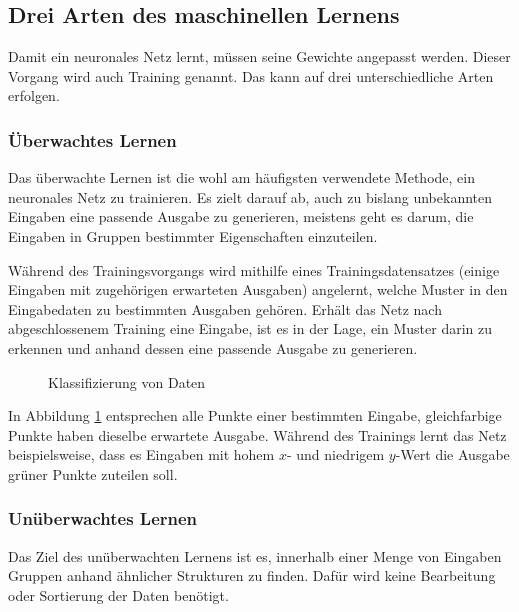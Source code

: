 \documentclass[12pt,a4]{article}
\begin{document}
\subsection{Drei Arten des maschinellen Lernens \cite{PythonMachineLearningChapter1}}
Damit ein neuronales Netz lernt, müssen seine Gewichte angepasst werden. Dieser Vorgang wird auch Training genannt. Das kann auf drei unterschiedliche Arten erfolgen.

\subsubsection{Überwachtes Lernen}
Das überwachte Lernen ist die wohl am häufigsten verwendete Methode, ein neuronales Netz zu trainieren. Es zielt darauf ab, auch zu bislang unbekannten Eingaben eine passende Ausgabe zu generieren, meistens geht es darum, die Eingaben in Gruppen bestimmter Eigenschaften einzuteilen. 

Während des Trainingsvorgangs wird mithilfe eines Trainingsdatensatzes (einige Eingaben mit zugehörigen erwarteten Ausgaben) angelernt, welche Muster in den Eingabedaten zu bestimmten Ausgaben gehören. Erhält das Netz nach abgeschlossenem Training eine Eingabe, ist es in der Lage, ein Muster darin zu erkennen und anhand dessen eine passende Ausgabe zu generieren.

\begin{figure}[!h]
\centering
{}
\caption{Klassifizierung von Daten}
\label{fig:SupervisedLearning}
\end{figure}

In Abbildung \ref{fig:SupervisedLearning} entsprechen alle Punkte einer bestimmten Eingabe, gleichfarbige Punkte haben dieselbe erwartete Ausgabe. Während des Trainings lernt das Netz beispielsweise, dass es Eingaben mit hohem $x$- und niedrigem $y$-Wert die Ausgabe grüner Punkte zuteilen soll.

\subsubsection{Unüberwachtes Lernen}
Das Ziel des unüberwachten Lernens ist es, innerhalb einer Menge von Eingaben Gruppen anhand ähnlicher Strukturen zu finden. Dafür wird keine Bearbeitung oder Sortierung der Daten benötigt.
\end{document}
